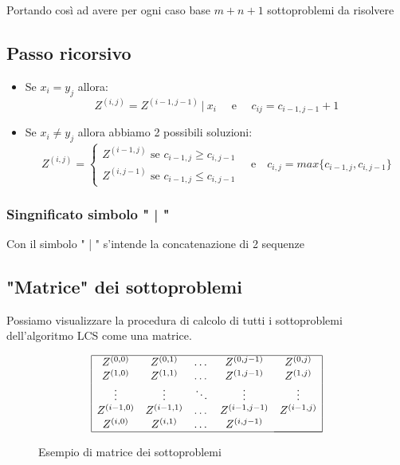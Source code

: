 Portando così ad avere per ogni caso base $m+n+1$ sottoproblemi da risolvere

\subsection{Passo ricorsivo}
\begin{itemize}
    \item Se $x_i = y_j$ allora:
        $$
            Z^{(i,j)} = Z^{(i-1,j-1)}\ |\ x_i \quad \text{ e } \quad c_{ij} = c_{i-1,j-1} + 1
        $$
    
    \item Se $x_i \not= y_j$ allora abbiamo 2 possibili soluzioni:
            $$
            Z^{(i,j)} = 
                \begin{cases}
                    Z^{(i-1,j)} \text{ se } c_{i-1,j} \geq c_{i,j-1} \\
                    Z^{(i,j-1)} \text{ se } c_{i-1,j} \leq c_{i,j-1} 
                \end{cases} \quad \text{e} \quad c_{i,j} = max\{c_{i-1,j}, c_{i,j-1}\}
            $$
\end{itemize}

\subsubsection{Singnificato simbolo " | "}
Con il simbolo " | " s'intende la concatenazione di 2 sequenze 

\newpage
\subsection{"Matrice" dei sottoproblemi}
Possiamo visualizzare la procedura di calcolo di tutti i sottoproblemi dell'algoritmo LCS come una matrice. 

\begin{figure}[h]
    {\Large \[
    \begin{array}{|ccccc|}
    \hline
    Z^{(0,0)} & Z^{(0,1)} & \dots & Z^{(0,j-1)} & Z^{(0,j)} \\
    Z^{(1,0)} & Z^{(1,1)} & \dots & Z^{(1,j-1)} & Z^{(1,j)} \\
    \vdots & \vdots & \ddots & \vdots & \vdots \\
    Z^{(i-1,0)} & Z^{(i-1,1)} & \dots & Z^{(i-1,j-1)} & Z^{(i-1,j)} \\
    Z^{(i,0)} & Z^{(i,1)} & \dots & Z^{(i,j-1)} & \multicolumn{1}{c|}{} \\ \cline{5-5}
    \hline
    \end{array}
    \]}

    \caption{Esempio di matrice dei sottoproblemi}
\end{figure}

